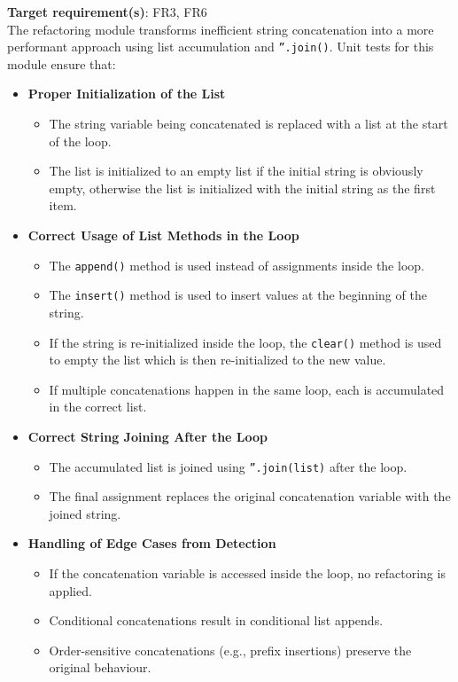 \documentclass[12pt, titlepage]{article}
\begin{document}
\textbf{Target requirement(s)}: FR3, FR6~\cite{SRS} \\

\noindent
The refactoring module transforms inefficient string concatenation into a more performant approach using list accumulation and \texttt{''.join()}. Unit tests for this module ensure that:

\begin{itemize}
    \item \textbf{Proper Initialization of the List}
    \begin{itemize}
        \item The string variable being concatenated is replaced with a list at the start of the loop.
        \item The list is initialized to an empty list if the initial string is obviously empty, otherwise the list is initialized with the initial string as the first item.
    \end{itemize}

    \item \textbf{Correct Usage of List Methods in the Loop}
    \begin{itemize}
        \item The \texttt{append()} method is used instead of assignments inside the loop.
        \item The \texttt{insert()} method is used to insert values at the beginning of the string.
        \item If the string is re-initialized inside the loop, the \texttt{clear()} method is used to empty the list which is then re-initialized to the new value.
        \item If multiple concatenations happen in the same loop, each is accumulated in the correct list.
    \end{itemize}

    \item \textbf{Correct String Joining After the Loop}
    \begin{itemize}
        \item The accumulated list is joined using \texttt{''.join(list)} after the loop.
        \item The final assignment replaces the original concatenation variable with the joined string.
    \end{itemize}

    \item \textbf{Handling of Edge Cases from Detection}
    \begin{itemize}
        \item If the concatenation variable is accessed inside the loop, no refactoring is applied.
        \item Conditional concatenations result in conditional list appends.
        \item Order-sensitive concatenations (e.g., prefix insertions) preserve the original behaviour.
    \end{itemize}


\end{itemize}
\end{document}
